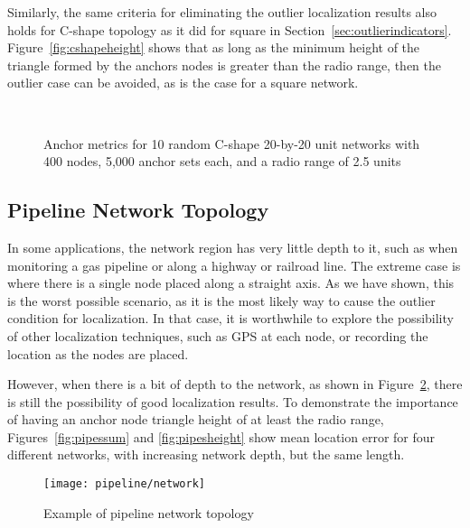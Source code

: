Similarly, the same criteria for eliminating the outlier localization results also holds for C-shape topology as it did for square in Section~\ref{sec:outlierindicators}.  Figure~\ref{fig:cshapeheight} shows that as long as the minimum height of the triangle formed by the anchors nodes is greater than the radio range, then the outlier case can be avoided, as is the case for a square network.

\begin{figure}
  \centering
	\\
	\caption[Anchor metrics for a C-Shape topology]{Anchor metrics for 10 random C-shape 20-by-20 unit networks with 400 nodes, 5,000 anchor sets each, and a radio range of 2.5 units}
	\label{fig:cindicator}
\end{figure}

\subsection{Pipeline Network Topology}

In some applications, the network region has very little depth to it, such as when monitoring a gas pipeline or along a highway or railroad line.  The extreme case is where there is a single node placed along a straight axis.  As we have shown, this is the worst possible scenario, as it is the most likely way to cause the outlier condition for localization.  In that case, it is worthwhile to explore the possibility of other localization techniques, such as GPS at each node, or recording the location as the nodes are placed.

However, when there is a bit of depth to the network, as shown in Figure~\ref{fig:pipeline}, there is still the possibility of good localization results.  To demonstrate the importance of having an anchor node triangle height of at least the radio range, Figures~\ref{fig:pipessum} and \ref{fig:pipesheight} show mean location error for four different networks, with increasing network depth, but the same length.  

\begin{figure}
  \centering
	\texttt{[image: pipeline/network]}
	\caption{Example of pipeline network topology}
	\label{fig:pipeline}
\end{figure}

